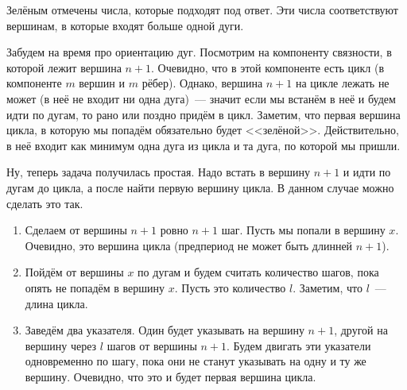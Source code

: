 \documentclass[addpoints]{exam}
\begin{document}
\begin{questions}
\begin{solution}
\begin{center}

\end{center}

Зелёным отмечены числа, которые подходят под ответ. Эти числа соответствуют вершинам, в которые входят больше одной дуги.

Забудем на время про ориентацию дуг. Посмотрим на компоненту связности, в которой лежит вершина $n+1$. Очевидно, что в этой компоненте есть цикл (в компоненте $m$ вершин и $m$ рёбер). Однако, вершина $n+1$ на цикле лежать не может (в неё не входит ни одна дуга)~--- значит если мы встанём в неё и будем идти по дугам, то рано или поздно придём в цикл. Заметим, что первая вершина цикла, в которую мы попадём обязательно будет <<зелёной>>. Действительно, в неё входит как минимум одна дуга из цикла и та дуга, по которой мы пришли.

Ну, теперь задача получилась простая. Надо встать в вершину $n+1$ и идти по дугам до цикла, а после найти первую вершину цикла. В данном случае можно сделать это так.

\begin{enumerate}

\item Сделаем от вершины $n+1$ ровно $n+1$ шаг. Пусть мы попали в вершину $x$. Очевидно, это вершина цикла (предпериод не может быть длинней $n+1$).

\item Пойдём от вершины $x$ по дугам и будем считать количество шагов, пока опять не попадём в вершину $x$. Пусть это количество $l$. Заметим, что $l$~--- длина цикла. 

\item Заведём два указателя. Один будет указывать на вершину $n+1$, другой на вершину через $l$ шагов от вершины $n+1$. Будем двигать эти указатели одновременно по шагу, пока они не станут указывать на одну и ту же вершину. Очевидно, что это и будет первая вершина цикла.

\end{enumerate}

\end{solution}





\end{questions}
\end{document}
